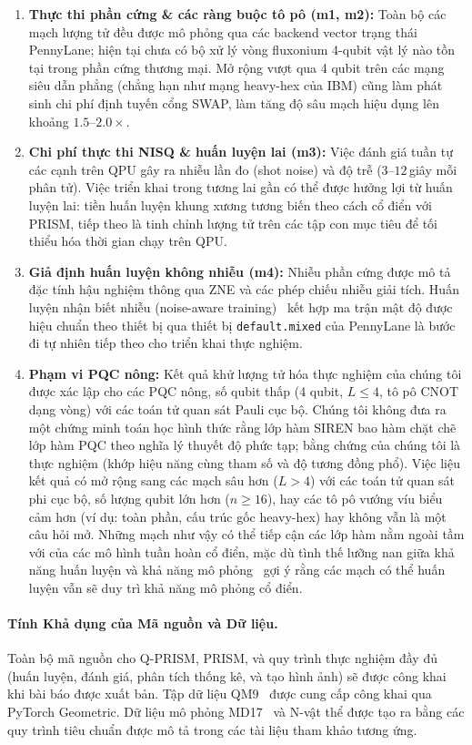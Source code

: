 \documentclass[10pt,twocolumn,letterpaper]{article}
\begin{document}
\begin{enumerate}
    \item \textbf{Thực thi phần cứng \& các ràng buộc tô pô (m1, m2):} Toàn bộ các mạch lượng tử đều được mô phỏng qua các backend vector trạng thái PennyLane; hiện tại chưa có bộ xử lý vòng fluxonium 4-qubit vật lý nào tồn tại trong phần cứng thương mại. Mở rộng vượt qua 4 qubit trên các mạng siêu dẫn phẳng (chẳng hạn như mạng heavy-hex của IBM) cũng làm phát sinh chi phí định tuyến cổng SWAP, làm tăng độ sâu mạch hiệu dụng lên khoảng $1.5$--$2.0\times$.
    \item \textbf{Chi phí thực thi NISQ \& huấn luyện lai (m3):} Việc đánh giá tuần tự các cạnh trên QPU gây ra nhiễu lần đo (shot noise) và độ trễ ($3$--$12$\,giây mỗi phân tử). Việc triển khai trong tương lai gần có thể được hưởng lợi từ huấn luyện lai: tiền huấn luyện khung xương tương biến theo cách cổ điển với PRISM, tiếp theo là tinh chỉnh lượng tử trên các tập con mục tiêu để tối thiểu hóa thời gian chạy trên QPU.
    \item \textbf{Giả định huấn luyện không nhiễu (m4):} Nhiễu phần cứng được mô tả đặc tính hậu nghiệm thông qua ZNE và các phép chiếu nhiễu giải tích. Huấn luyện nhận biết nhiễu (noise-aware training)~\cite{cincio2021machine, Sharma:2020qjq} kết hợp ma trận mật độ được hiệu chuẩn theo thiết bị qua thiết bị \texttt{default.mixed} của PennyLane là bước đi tự nhiên tiếp theo cho triển khai thực nghiệm.
    \item \textbf{Phạm vi PQC nông:} Kết quả khử lượng tử hóa thực nghiệm của chúng tôi được xác lập cho các PQC nông, số qubit thấp (4 qubit, $L \le 4$, tô pô CNOT dạng vòng) với các toán tử quan sát Pauli cục bộ. Chúng tôi không đưa ra một chứng minh toán học hình thức rằng lớp hàm SIREN bao hàm chặt chẽ lớp hàm PQC theo nghĩa lý thuyết độ phức tạp; bằng chứng của chúng tôi là thực nghiệm (khớp hiệu năng cùng tham số và độ tương đồng phổ). Việc liệu kết quả có mở rộng sang các mạch sâu hơn ($L > 4$) với các toán tử quan sát phi cục bộ, số lượng qubit lớn hơn ($n \ge 16$), hay các tô pô vướng víu biểu cảm hơn (ví dụ: toàn phần, cấu trúc gốc heavy-hex) hay không vẫn là một câu hỏi mở. Những mạch như vậy có thể tiếp cận các lớp hàm nằm ngoài tầm với của các mô hình tuần hoàn cổ điển, mặc dù tình thế lưỡng nan giữa khả năng huấn luyện và khả năng mô phỏng~\cite{Cerezo:2023nqf} gợi ý rằng các mạch có thể huấn luyện vẫn sẽ duy trì khả năng mô phỏng cổ điển.
\end{enumerate}

\paragraph{Tính Khả dụng của Mã nguồn và Dữ liệu.}
Toàn bộ mã nguồn cho Q-PRISM, PRISM, và quy trình thực nghiệm đầy đủ (huấn luyện, đánh giá, phân tích thống kê, và tạo hình ảnh) sẽ được công khai khi bài báo được xuất bản. Tập dữ liệu QM9~\cite{ramakrishnan2014quantum} được cung cấp công khai qua PyTorch Geometric. Dữ liệu mô phỏng MD17~\cite{chmielaMachineLearningAccurate2016} và N-vật thể được tạo ra bằng các quy trình tiêu chuẩn được mô tả trong các tài liệu tham khảo tương ứng.
\end{document}
